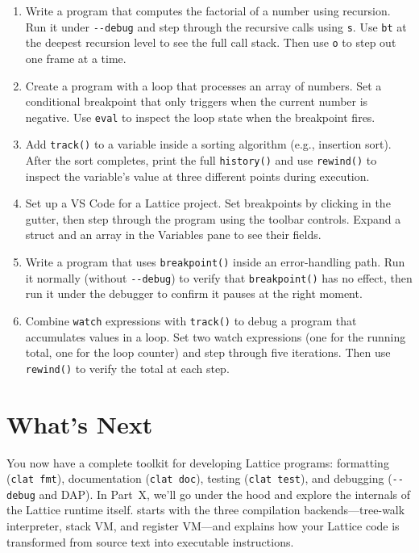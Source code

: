 \begin{enumerate}
  \item Write a program that computes the factorial of a number using recursion. Run it under \lstinline|--debug| and step through the recursive calls using \lstinline|s|. Use \lstinline|bt| at the deepest recursion level to see the full call stack. Then use \lstinline|o| to step out one frame at a time.

  \item Create a program with a loop that processes an array of numbers. Set a conditional breakpoint that only triggers when the current number is negative. Use \lstinline|eval| to inspect the loop state when the breakpoint fires.

  \item Add \lstinline|track()| to a variable inside a sorting algorithm (e.g., insertion sort). After the sort completes, print the full \lstinline|history()| and use \lstinline|rewind()| to inspect the variable's value at three different points during execution.

  \item Set up a VS Code  for a Lattice project. Set breakpoints by clicking in the gutter, then step through the program using the toolbar controls. Expand a struct and an array in the Variables pane to see their fields.

  \item Write a program that uses \lstinline|breakpoint()| inside an error-handling path. Run it normally (without \lstinline|--debug|) to verify that \lstinline|breakpoint()| has no effect, then run it under the debugger to confirm it pauses at the right moment.

  \item Combine \lstinline|watch| expressions with \lstinline|track()| to debug a program that accumulates values in a loop. Set two watch expressions (one for the running total, one for the loop counter) and step through five iterations. Then use \lstinline|rewind()| to verify the total at each step.
\end{enumerate}

\section*{What's Next}\label{sec:debugging-next}

You now have a complete toolkit for developing Lattice programs: formatting (\lstinline|clat fmt|), documentation (\lstinline|clat doc|), testing (\lstinline|clat test|), and debugging (\lstinline|--debug| and DAP).
In Part~X, we'll go under the hood and explore the internals of the Lattice runtime itself.
 starts with the three compilation backends---tree-walk interpreter, stack VM, and register VM---and explains how your Lattice code is transformed from source text into executable instructions.
